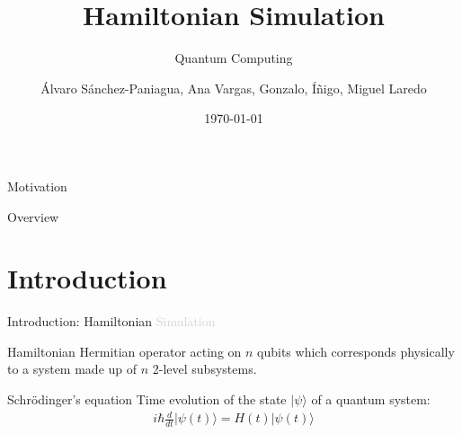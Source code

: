 \documentclass[aspectratio=169,xcolor=dvipsnames]{beamer}
\title{Hamiltonian Simulation}
\subtitle{Quantum Computing}
\author{Álvaro Sánchez-Paniagua, Ana Vargas, Gonzalo, Íñigo, Miguel Laredo}
\institute
{
    Based on the notes from Ashley Montaro %
}
\date{\today} %
\begin{document}
\begin{frame}
    \titlepage
\end{frame}

\begin{frame}{Motivation}
\end{frame}


\begin{frame}{Overview}
    \tableofcontents
\end{frame}






\section{Introduction}
\begin{frame}{Introduction: Hamiltonian \textcolor{lightgray}{Simulation}}
    \begin{block}{Hamiltonian}
        Hermitian operator acting on $n$ qubits which corresponds physically to a system made up of $n$ 2-level subsystems.
    \end{block}
    \begin{block}{Schrödinger’s equation}
        Time evolution of the state $|\psi\rangle$ of a quantum system:
        \begin{align*}
            i \hbar \frac{d}{dt}|\psi(t)\rangle = H(t)|\psi(t)\rangle
        \end{align*}
    \end{block}
\end{frame}
\end{document}
